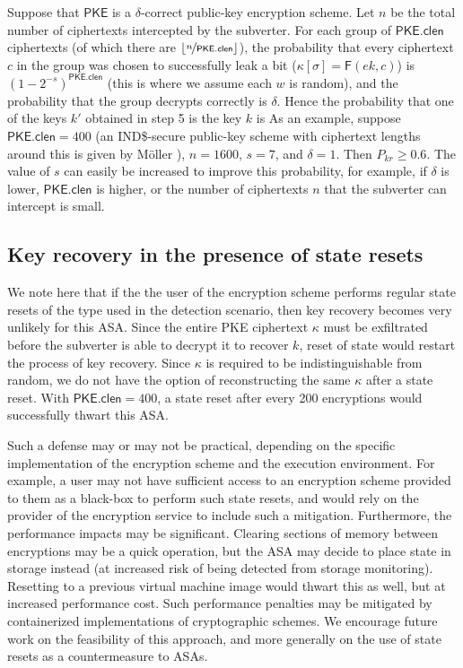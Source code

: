 Suppose that $\mathsf{PKE}$ is a $\delta$-correct public-key encryption scheme. Let $n$ be the total number of ciphertexts intercepted by the subverter. For each group of $\mathsf{PKE.clen}$ ciphertexts (of which there are $\lfloor \nicefrac{n}{\mathsf{PKE.clen}} \rfloor$), the probability that every ciphertext $c$ in the group was chosen to successfully leak a bit ($\kappa[\sigma]=\mathsf{F}(ek,c)$) is $(1-2^{-s})^\mathsf{PKE.clen}$ (this is where we assume each $w$ is random), and the probability that the group decrypts correctly is $\delta$. Hence the probability that one of the keys $k'$ obtained in step 5 is the key $k$ is
As an example, suppose $\mathsf{PKE.clen}=400$ (an IND\$-secure public-key scheme with ciphertext lengths around this is given by Möller \cite{ESORICS:Moller04}), $n=1600$, $s=7$, and $\delta=1$. Then $P_{kr}\ge 0.6$. The value of $s$ can easily be increased to improve this probability, for example, if $\delta$ is lower, $\mathsf{PKE.clen}$ is higher, or the number of ciphertexts $n$ that the subverter can intercept is small.

\subsection{Key recovery in the presence of state resets}
We note here that if the the user of the encryption scheme performs regular state resets of the type used in the detection scenario, then key recovery becomes very unlikely for this ASA. Since the entire \textsf{PKE} ciphertext $\kappa$ must be exfiltrated before the subverter is able to decrypt it to recover $k$, reset of state would restart the process of key recovery. Since $\kappa$ is required to be indistinguishable from random, we do not have the option of reconstructing the same $\kappa$ after a state reset. With $\mathsf{PKE.clen}=400$, a state reset after every 200 encryptions would successfully thwart this ASA.

Such a defense may or may not be practical, depending on the specific implementation of the encryption scheme and the execution environment. For example, a user may not have sufficient access to an encryption scheme provided to them as a black-box to perform such state resets, and would rely on the provider of the encryption service to include such a mitigation. Furthermore, the performance impacts may be significant. Clearing sections of memory between encryptions may be a quick operation, but the ASA may decide to place state in storage instead (at increased risk of being detected from storage monitoring). Resetting to a previous virtual machine image would thwart this as well, but at increased performance cost. Such performance penalties may be mitigated by containerized implementations of cryptographic schemes. We encourage future work on the feasibility of this approach, and more generally on the use of state resets as a countermeasure to ASAs.
